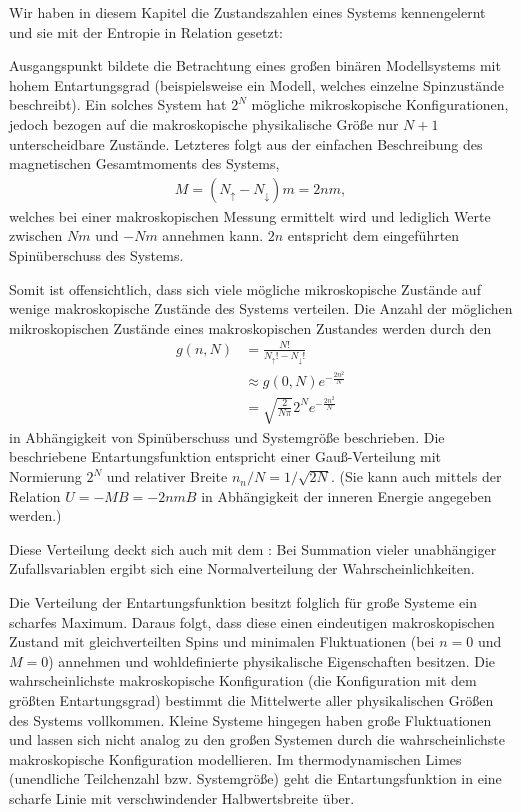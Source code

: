 \begin{summary}
    Wir haben in diesem Kapitel die Zustandszahlen eines Systems kennengelernt und sie mit der Entropie in Relation gesetzt:

    Ausgangspunkt bildete die Betrachtung eines großen binären Modellsystems mit hohem Entartungsgrad (beispielsweise ein Modell, welches einzelne Spinzustände beschreibt).
    Ein solches System hat $2^N$ mögliche mikroskopische Konfigurationen, jedoch \textendash{} bezogen auf die makroskopische physikalische Größe \textendash{} nur $N+1$ unterscheidbare Zustände. Letzteres folgt aus der einfachen Beschreibung des magnetischen Gesamtmoments des Systems, 
     \begin{align*}
        M=(N_\uparrow-N_\downarrow)m=2nm,
    \end{align*}
    welches bei einer makroskopischen Messung ermittelt wird und lediglich Werte zwischen $Nm$ und $-Nm$ annehmen kann. $2n$ entspricht dem eingeführten Spinüberschuss des Systems.

    Somit ist offensichtlich, dass sich viele mögliche mikroskopische Zustände auf wenige makroskopische Zustände des Systems verteilen. Die Anzahl der möglichen mikroskopischen Zustände eines makroskopischen Zustandes werden durch den  
    \begin{align*}
        g(n,N)&=\frac{N!}{N_\uparrow!-N_\downarrow!}\\&\approx g(0,N)e^{-\frac{2n^2}{N}}\\&=\sqrt{\frac{2}{N\pi}}2^Ne^{-\frac{2n^2}{N}}
    \end{align*}
    in Abhängigkeit von Spinüberschuss und Systemgröße beschrieben. Die beschriebene Entartungsfunktion entspricht einer Gauß-Verteilung mit Normierung $2^N$ und relativer Breite $n_n/N=1/\sqrt{2N}$. (Sie kann auch mittels der Relation $U=-MB=-2nmB$ in Abhängigkeit der inneren Energie angegeben werden.)

    Diese Verteilung deckt sich auch mit dem : Bei Summation vieler unabhängiger Zufallsvariablen ergibt sich eine Normalverteilung der Wahrscheinlichkeiten.

    Die Verteilung der Entartungsfunktion besitzt folglich für große Systeme ein scharfes Maximum. Daraus folgt, dass diese einen eindeutigen makroskopischen Zustand mit gleichverteilten Spins und minimalen Fluktuationen (bei $n=0$ und $M=0$) annehmen und wohldefinierte physikalische Eigenschaften besitzen. Die wahrscheinlichste makroskopische Konfiguration (die Konfiguration mit dem größten Entartungsgrad) bestimmt die Mittelwerte aller physikalischen Größen des Systems vollkommen. 
    Kleine Systeme hingegen haben große Fluktuationen und lassen sich nicht analog zu den großen Systemen durch die wahrscheinlichste makroskopische Konfiguration modellieren.
    Im thermodynamischen Limes (unendliche Teilchenzahl bzw. Systemgröße) geht die Entartungsfunktion in eine scharfe Linie mit verschwindender Halbwertsbreite über. 
      

\end{summary}
